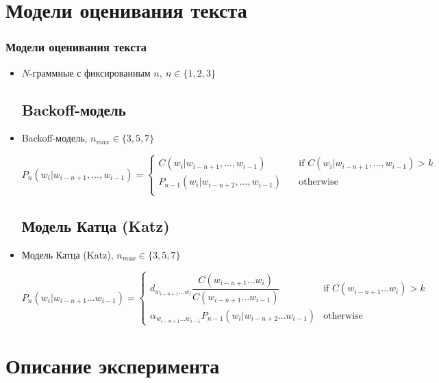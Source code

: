 \documentclass[aspectratio=169, pdf, 9pt, utf8]{beamer}
\begin{document}
\section{ Модели оценивания текста }

\begin{frame}
	\frametitle{Модели оценивания текста}
	
	\begin{itemize}

\subsection{ Простые n-граммные }
		\item $N$-граммные с фиксированным $n,\ n \in \{1,2,3\}$
			
\subsection{ Backoff-модель }
		\item Backoff-модель, $n_{max} \in \{ 3, 5, 7 \}$
		
		\[ P_n(w_i | w_{i - n + 1}, ..., w_{i - 1}) =
		\begin{cases}
		C(w_i | w_{i - n + 1}, ..., w_{i - 1})       & \quad \text{if } C(w_i | w_{i - n + 1}, ..., w_{i - 1}) > k\\
		P_{n - 1}(w_i | w_{i - n + 2}, ..., w_{i - 1})  & \quad \text{otherwise }\\
		\end{cases}
		\]

\subsection{ Модель Катца (Katz) }		
		\item Модель Катца (Katz),  $n_{max} \in \{ 3, 5, 7 \}$
		
		\[
		P_{n}\left( w_i | w_{i-n+1}...w_{i-1} \right) = 
		\begin{cases}
		d_{w_{i-n+1}...w_i} \dfrac{C(w_{i-n+1}...w_i)}{C(w_{i-n+1}...w_{i-1})} &\text{if $C(w_{i-n+1}...w_i) > k$}\\
		\alpha_{w_{i-n+1}...w_{i-1}} P_{n - 1}\left( w_i | w_{i-n+2}...w_{i-1} \right) &\text{otherwise}
		\end{cases}
		\]
		
	\end{itemize}

\end{frame}

\section{ Описание эксперимента }
\end{document}
